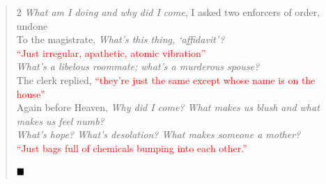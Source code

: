 \documentclass[11pt]{book}
\begin{document}
\begin{verse}
\begin{multicols}{2}
\emph{What am I doing and why did I come}, I asked two enforcers of order, undone \\
To the magistrate, \emph{What's this thing, `affidavit'?} \\
\textcolor{Red}{``Just irregular, apathetic, atomic vibration''} \\
\emph{What's a libelous roommate; what's a murderous spouse?} \\
The clerk replied, \textcolor{Red}{``they're just the same except whose name is on the house''} \\
Again before Heaven, \emph{Why did I come? What makes us blush and what makes us feel numb?} \\
\emph{What's hope? What's desolation? What makes someone a mother?} \\
\textcolor{Red}{``Just bags full of chemicals bumping into each other.''}

$\hfill\blacksquare$

\end{multicols}
\end{verse}

\newpage
\end{document}
